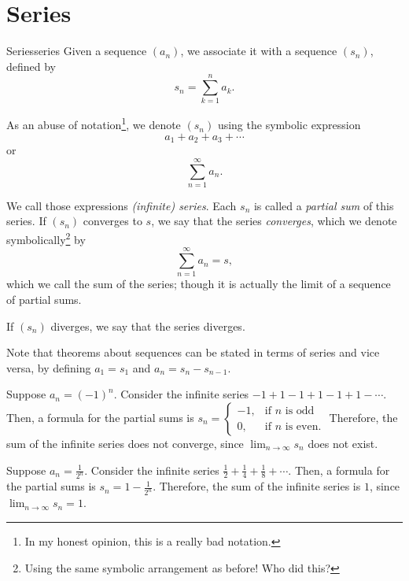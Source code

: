 \section{Series}

\begin{defn}{Series}{series}
	Given a sequence \((a_n)\), we associate it with a sequence \((s_n)\), defined by \[
		s_n = \sum_{k = 1}^n a_k.
	\]

	As an abuse of notation\footnote{In my honest opinion, this is a really bad notation.}, we denote \((s_n)\) using the symbolic expression \[
		a_1 + a_2 + a_3 + \cdots
	\]
	or \[
		\sum_{n=1}^\infty a_n.
	\]

	We call those expressions \emph{(infinite) series}. Each \(s_n\) is called a \emph{partial sum} of this series. If \((s_n)\) converges to \(s\), we say that the series \emph{converges}, which we denote symbolically\footnote{Using the same symbolic arrangement as before! Who did this?} by \[
		\sum_{n=1}^\infty a_n = s,
	\]
	which we call the sum of the series; though it is actually the limit of a sequence of partial sums.

	If \((s_n)\) diverges, we say that the series diverges.
\end{defn}

Note that theorems about sequences can be stated in terms of series and vice versa, by defining \(a_1 = s_1\) and \(a_n = s_n - s_{n-1}\). 

\begin{exmp}{}{}
	Suppose \(a_n = (-1)^n\). Consider the infinite series  \(
		-1 + 1 - 1 + 1 - 1 + 1 - \cdots
		\).
	Then, a formula for the partial sums is \(
		s_n = 
		\begin{cases}
			-1, & \text{if } n \text{ is odd}\\
			0, & \text{if } n \text{ is even.}
		\end{cases}
		\)
		Therefore, the sum of the infinite series does not converge, since \(\lim_{n\to\infty}s_n\) does not exist.
\end{exmp}

\begin{exmp}{}{}
	Suppose \(a_n = \frac{1}{2^n}\). Consider the infinite series  \(
		\frac{1}{2} + \frac{1}{4} + \frac{1}{8} + \cdots
	\).
	Then, a formula for the partial sums is \(
	s_n = 1 - \frac{1}{2^n}
	\).
	Therefore, the sum of the infinite series is \(1\), since \(\lim_{n\to\infty}s_n = 1\).
\end{exmp}

